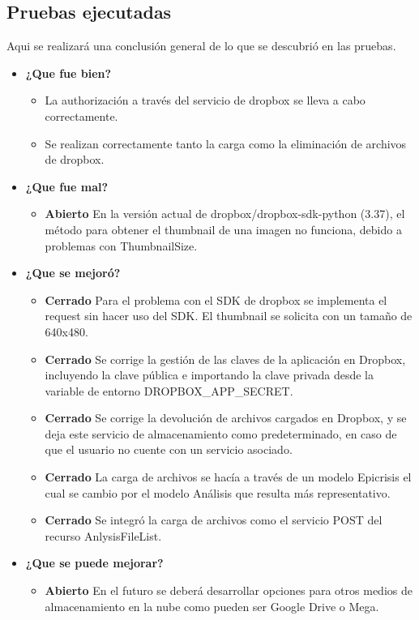 \subsection{Pruebas ejecutadas}
Aqui se realizará una conclusión general de lo que se descubrió en las pruebas.
	\begin{itemize}
		\item \textbf{¿Que fue bien?}
        	\begin{itemize}
				\item La authorización a través del servicio de dropbox se lleva a cabo correctamente.
				\item Se realizan correctamente tanto la carga como la eliminación de archivos de dropbox.
			\end{itemize}
		\item \textbf{¿Que fue mal?}
        	\begin{itemize}
	          \item \textbf{Abierto} En la versión actual de dropbox/dropbox-sdk-python (3.37), el método para obtener el thumbnail de una imagen no funciona, debido a problemas con ThumbnailSize.
			\end{itemize}

   		\item \textbf{¿Que se mejoró?}
        	\begin{itemize}
                \item \textbf{Cerrado} Para el problema con el SDK de dropbox se implementa el request sin hacer uso del SDK. El thumbnail se solicita con un tamaño de 640x480.
                \item \textbf{Cerrado} Se corrige la gestión de las claves de la aplicación en Dropbox, incluyendo la clave pública e importando la clave privada desde la variable de entorno DROPBOX\_APP\_SECRET.
                \item \textbf{Cerrado} Se corrige la devolución de archivos cargados en Dropbox, y se deja este servicio de almacenamiento como predeterminado, en caso de que el usuario no cuente con un servicio asociado.
                \item \textbf{Cerrado} La carga de archivos se hacía a través de un modelo Epicrisis el cual se cambio por el modelo Análisis que resulta más representativo.
                \item \textbf{Cerrado} Se integró la carga de archivos como el servicio POST del recurso AnlysisFileList.
			\end{itemize}

   		\item \textbf{¿Que se puede mejorar?}
        	\begin{itemize}
		        \item \textbf{Abierto} En el futuro se deberá desarrollar opciones para otros medios de almacenamiento en la nube como pueden ser Google Drive o Mega.
            \end{itemize}
        

	\end{itemize}